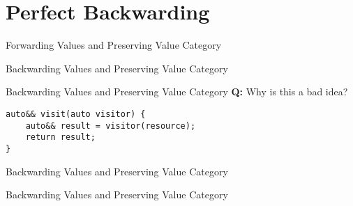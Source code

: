 \section{Perfect Backwarding}

\begin{frame}[fragile]{Forwarding Values and Preserving Value Category}
    \centering


\end{frame}

\begin{frame}[fragile]{Backwarding Values and Preserving Value Category}
\end{frame}

\begin{frame}[fragile]{Backwarding Values and Preserving Value Category}
    \textbf{Q:} Why is this a bad idea?
    \begin{lstlisting}
auto&& visit(auto visitor) {
    auto&& result = visitor(resource);
    return result;
}
    \end{lstlisting}
    
\end{frame}

\begin{frame}[fragile]{Backwarding Values and Preserving Value Category}
\end{frame}

\begin{frame}[fragile]{Backwarding Values and Preserving Value Category}
\end{frame}

